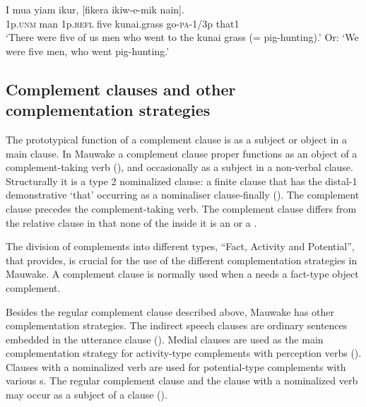 \ea%
\label{ex:8:x1570}
\gll I  mua  yiam  ikur,  [fikera  ikiw-e-mik  nain]. \\
1p.\textsc{unm} man 1p.\textsc{refl} five kunai.grass go-\textsc{pa}-1/3p that1\\
\glt`There were five of us men who went to the kunai grass (= pig-hunting).' Or: `We were five men, who went pig-hunting.'
\z


\subsection{Complement clauses and other complementation strategies} \label{sec:8.3.2}

The prototypical function of a complement clause is as a subject or object in a main clause. In Mauwake a complement clause proper functions as an object of a complement-taking verb (), and occasionally as a subject in a non-verbal clause. Structurally it is a type 2 nominalized clause: a finite clause that has the distal-1 demonstrative  `that' occurring as a nominaliser clause-finally (). The complement clause precedes the complement-taking verb. The complement clause differs from the relative clause in that none of the  inside it is an  or a . 

The division of complements into different types, ``Fact, Activity and Potential'', that \citet[371]{Dixon2010b} provides, is crucial for the use of the different complementation strategies in Mauwake.  A complement clause is normally used when a  needs a fact-type object complement.

Besides the regular complement clause described above, Mauwake has other complementation strategies. The indirect speech clauses are ordinary sentences embedded in the utterance clause (). Medial clauses are used as the main complementation strategy for activity-type complements with perception verbs (). Clauses with a nominalized verb are used for potential-type complements with various s. The regular complement clause and the clause with a nominalized verb may occur as a subject of a clause (). 

